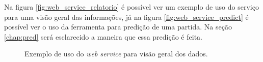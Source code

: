 Na figura \ref{fig:web_service_relatorio} é possível ver um exemplo de uso do serviço para uma visão geral das informações, já na figura \ref{fig:web_service_predict} é possível ver o uso da ferramenta para predição de uma partida. Na seção \ref{chap:pred} será esclarecido a maneira que essa predição é feita.



\begin{figure}[H]
	
	\centering
	\caption{Exemplo de uso do \textit{web service} para visão geral dos dados.}
	\qquad
\end{figure}
